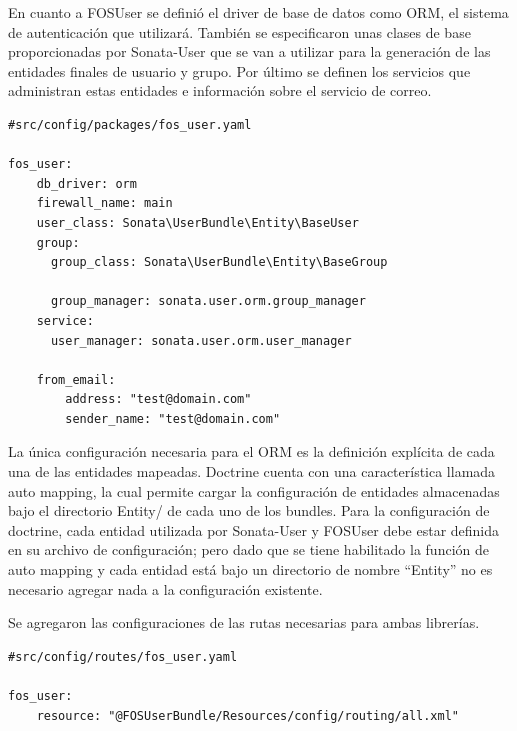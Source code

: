 En cuanto a FOSUser se definió el driver de base de datos como ORM, el sistema de autenticación que utilizará\@. También se especificaron unas clases de base
proporcionadas por Sonata-User que se van a utilizar para la generación de las entidades finales de usuario y grupo\@. Por último se definen los servicios
que administran estas entidades e información sobre el servicio de correo.

\begin{lstlisting}[caption={archivo de configuración de FOSUser\\ Fuente: \sonatainstallation.}]
#src/config/packages/fos_user.yaml

fos_user:
    db_driver: orm
    firewall_name: main
    user_class: Sonata\UserBundle\Entity\BaseUser
    group:
      group_class: Sonata\UserBundle\Entity\BaseGroup

      group_manager: sonata.user.orm.group_manager
    service:
      user_manager: sonata.user.orm.user_manager

    from_email:
        address: "test@domain.com"
        sender_name: "test@domain.com"

\end{lstlisting}



La única configuración necesaria para el ORM es la definición explícita de cada una de las entidades mapeadas.
Doctrine cuenta con una característica llamada auto mapping, la cual permite cargar la configuración de entidades almacenadas bajo el directorio Entity/
de cada uno de los bundles.
Para la configuración de doctrine, cada entidad utilizada por Sonata-User y FOSUser debe estar definida en su archivo de configuración; pero dado que se
tiene habilitado la función de auto mapping y cada entidad está bajo un directorio de nombre “Entity” no es necesario agregar nada a la configuración existente.



Se agregaron las configuraciones de las rutas necesarias para ambas librerías.



\begin{lstlisting}[caption={archivo de configuración de rutas de FOSUser\\Fuente: \sonatainstallation.}]
#src/config/routes/fos_user.yaml

fos_user:
    resource: "@FOSUserBundle/Resources/config/routing/all.xml"
\end{lstlisting}


